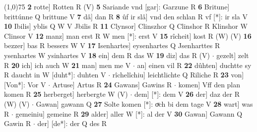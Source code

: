 \documentclass[8pt,a4paper,notitlepage]{article}
\begin{document}
\begin{table}[ht]
\begin{minipage}[t]{0.5\linewidth}
\line(1,0){75} \newline
\textbf{2} rotte] Rotten R (V) \textbf{5} Sariande vnd [gar]: Garzune R \textbf{6} Britune] brittúnne Q brittune V \textbf{7} dâ] dan R \textbf{8} ûf ir slâ] vnd den schlan R vf [*]: ir sla V \textbf{10} Ibilis] yblis Q W V Jbilis R \textbf{11} Clynsor] Clinszhor Q Clinshor R Klinshor W Clinsor V \textbf{12} manz] man erst R W men [*]: erst V \textbf{15} rîcheit] kost R (W) (V) \textbf{16} bezzer] bas R bessers W V \textbf{17} Isenhartes] eysenhartes Q Jsenharttes R ysenhartes W ysinhartes V \textbf{18} ein] dem R das W \textbf{19} diz] das R (V)  $\cdot$ gezelt] zelt R \textbf{20} ich] ich auch W \textbf{21} man] men me V  $\cdot$ an] einen vil R \textbf{22} dûhten] duchtte sy R daucht in W [duht*]: duhten V  $\cdot$ rîchelîchiu] leichtlichte Q Riliche R \textbf{23} von] [Von*]: Vor V  $\cdot$ Artuse] Artus R \textbf{24} Gawans] Gawins R  $\cdot$ komen] Vff den plan komen R \textbf{25} herberget] herbergte W (V)  $\cdot$ dem] [*]: dem V \textbf{26} der] daz der R (W) (V)  $\cdot$ Gawan] gawann Q \textbf{27} Solte komen [*]: oͮch bi dem tage V \textbf{28} wart] was R  $\cdot$ gemeiniu] gemeine R \textbf{29} alder] aller W [*]: al der V \textbf{30} Gawan] Gawann Q Gawin R  $\cdot$ der] [de*]: der Q des R \newline
\end{minipage}
\end{table}
\end{document}
